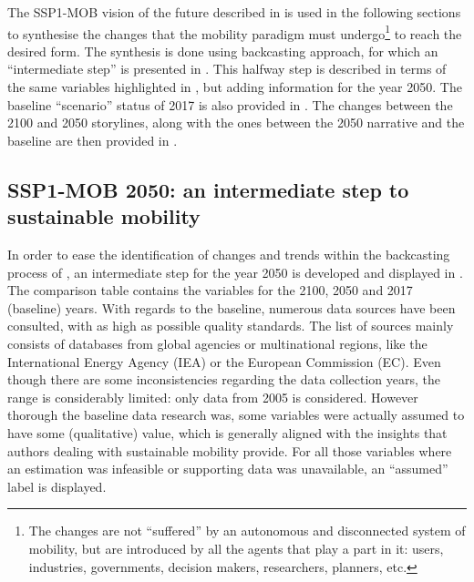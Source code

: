 The SSP1-MOB vision of the future described in  is used in the following sections to synthesise the changes that the mobility paradigm must undergo\footnote{The changes are not ``suffered'' by an autonomous and disconnected system of mobility, but are introduced by all the agents that play a part in it: users, industries, governments, decision makers, researchers, planners, etc.} to reach the desired form. The synthesis is done using backcasting approach, for which an ``intermediate step'' is presented in . This halfway step is described in terms of the same variables highlighted in , but adding information for the year 2050. The baseline ``scenario'' status of 2017 is also provided in . The changes between the 2100 and 2050 storylines, along with the ones between the 2050 narrative and the baseline are then provided in .

\subsection{SSP1-MOB 2050: an intermediate step to sustainable mobility}
\label{ss:results:backcasting-2050-intermediate-step}
In order to ease the identification of changes and trends within the backcasting process of , an intermediate step for the year 2050 is developed and displayed in . The comparison table contains the variables for the 2100, 2050 and 2017 (baseline) years. With regards to the baseline, numerous data sources have been consulted, with as high as possible quality standards. The list of sources mainly consists of databases from global agencies or multinational regions, like the International Energy Agency (IEA) or the European Commission (EC). Even though there are some inconsistencies regarding the data collection years, the range is considerably limited: only data from 2005 is considered. However thorough the baseline data research was, some variables were actually assumed to have some (qualitative) value, which is generally aligned with the insights that authors dealing with sustainable mobility provide. For all those variables where an estimation was infeasible or supporting data was unavailable, an ``assumed'' label is displayed.

